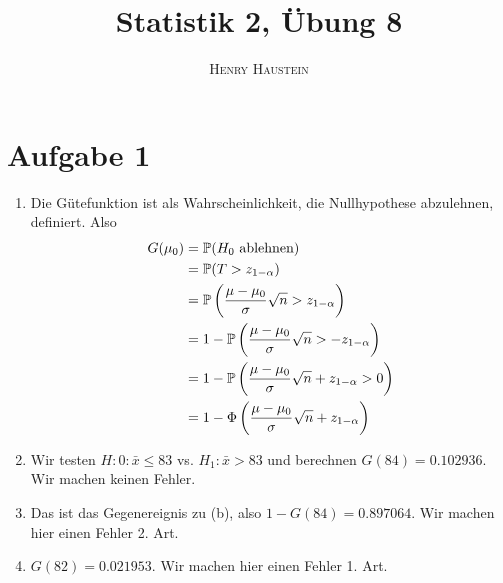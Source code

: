 \documentclass{article}
\title{\textbf{Statistik 2, Übung 8}}
\author{\textsc{Henry Haustein}}
\date{}
\begin{document}
	\maketitle
	
	\section*{Aufgabe 1}
	\begin{enumerate}[label=(\alph*)]
		\item Die Gütefunktion ist als Wahrscheinlichkeit, die Nullhypothese abzulehnen, definiert. Also
		\begin{align}
			G(\mu_0) &= \mathbb{P}(H_0\text{ ablehnen}) \notag \\
			&= \mathbb{P}(T > z_{1-\alpha}) \notag \\
			&= \mathbb{P}\left(\frac{\mu-\mu_0}{\sigma}\sqrt{n} > z_{1-\alpha}\right) \notag \\
			&= 1-\mathbb{P}\left(\frac{\mu-\mu_0}{\sigma}\sqrt{n} > -z_{1-\alpha}\right) \notag \\
			&= 1-\mathbb{P}\left(\frac{\mu-\mu_0}{\sigma}\sqrt{n} + z_{1-\alpha} > 0\right) \notag \\
			&= 1-\Phi\left(\frac{\mu-\mu_0}{\sigma}\sqrt{n} + z_{1-\alpha}\right) \notag
		\end{align}
		\item Wir testen $H:0: \bar{x} \le 83$ vs. $H_1: \bar{x} > 83$ und berechnen $G(84)=0.102936$. Wir machen keinen Fehler.
		\item Das ist das Gegenereignis zu (b), also $1-G(84)=0.897064$. Wir machen hier einen Fehler 2. Art.
		\item $G(82)=0.021953$. Wir machen hier einen Fehler 1. Art.
	\end{enumerate}
	
\end{document}
